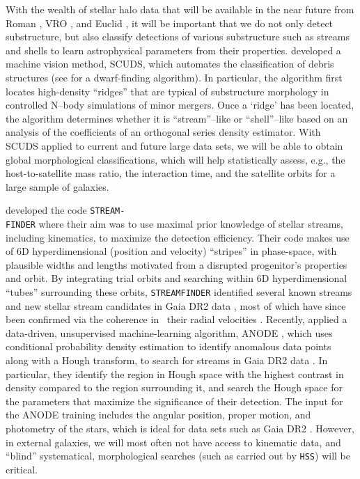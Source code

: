\documentclass[twocolumn]{aastex631}
\begin{document}
With the wealth of stellar halo data that will be available in the near future from Roman \citep[][]{spergel15}, VRO \citep[][]{laureijs11}, and Euclid \citep[][]{racca16}, it will be important that we do not only detect substructure, but also classify detections of various substructure such as streams and shells to learn astrophysical parameters from their properties.
\citet{hendel19} developed a machine vision method, SCUDS, which automates the classification of debris structures (see \citealt{Darragh-Ford2020} for a dwarf-finding algorithm). In particular, the algorithm first locates high-density ``ridges'' that are typical of substructure morphology in  controlled N–body simulations of minor mergers. Once a `ridge' has been located, the algorithm determines whether it is ``stream''--like or ``shell''--like based on an analysis of the coefficients of an orthogonal series density estimator. With SCUDS applied to current \citep[e.g.,][]{delgado10,delgado19,delgado21} and future large data sets, we will be able to obtain global morphological classifications, which will help statistically assess, e.g., the host-to-satellite mass ratio, the interaction time, and the satellite orbits for a large sample of galaxies. 


\citet{malhan18a} developed the code  \texttt{STREAM-\\FINDER} where their aim was to use maximal prior knowledge of stellar streams, including kinematics, to maximize the detection efficiency. Their code makes use of 6D hyperdimensional (position and velocity) ``stripes'' in phase-space, with plausible widths and lengths motivated from a disrupted progenitor's properties and orbit. By integrating trial orbits and searching within 6D hyperdimensional ``tubes'' surrounding these orbits, \texttt{STREAMFINDER} identified several known streams and new stellar stream candidates \citep[][]{malhan18b,ibata19b} in Gaia DR2 data \citep[][]{gaiadr2,Lindegren18}, most of which have since been confirmed via the coherence in  their radial velocities \citep[][]{ibata21}.
Recently, \citet{shih21} applied a data-driven, unsupervised machine-learning algorithm, ANODE \citep{nachman20}, which uses conditional probability density estimation to identify anomalous data points along with a Hough transform, to search for streams in Gaia DR2 data \citep[]{gaiadr2}. In particular, they identify the region in Hough space with the highest contrast in density compared to the region surrounding it, and search the Hough space for the parameters that maximize the significance of their detection. The input for the ANODE training includes the angular position, proper motion, and photometry of the stars, which is ideal for data sets such as Gaia DR2 \citep[]{gaiadr2}. %
However, in external galaxies, we will most often not have access to kinematic data, and ``blind'' systematical, morphological searches (such as carried out by \texttt{HSS}) will be critical. 
\end{document}
